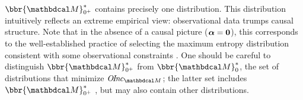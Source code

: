$\bbr{\dg M}^*_{0^+}$ contains precisely one distribution.
This distribution intuitively
reflects an extreme empirical
view: observational data trumps causal structure.
Note that in the absence of a causal picture
($\boldsymbol\alpha = \mathbf{0}$), 
this
corresponds to the well-established 
practice of selecting
the maximum entropy distribution consistent with some observational constraints \parencite{jaynes1957information}.
%
One should be careful to distinguish 
$\bbr{\dg M}^*_{0^+}$
from $\bbr{\dg M}^*_0$,
the set of distributions that minimize
$\OInc_{\dg M}$; the latter  set
includes
 $\bbr{\dg M}^*_{0^+}$
\parencite[Prop 3.4]{pdg-aaai},
but may also contain other distributions.
